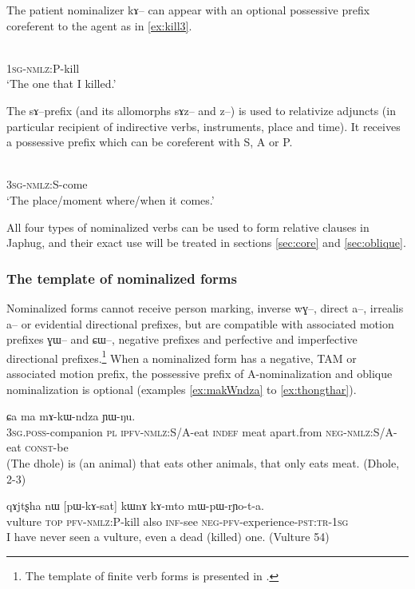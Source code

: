 \documentclass[oldfontcommands,oneside,a4paper,11pt]{article}
\newcommand{\ipa}[1]{{\phon #1}} %
\begin{document}
  The patient nominalizer \ipa{kɤ--} can appear with an optional possessive prefix coreferent to the agent as in \ref{ex:kill3}.
  \begin{exe}
\ex \label{ex:kill3}
\gll \ipa{a-kɤ-sat}    \\
   \textsc{1sg-nmlz}:P-kill \\
 \glt  `The one that I killed.'
 \end{exe}

The \ipa{sɤ}--prefix (and its allomorphs \ipa{sɤz}-- and \ipa{z}--) is used to relativize adjuncts (in particular recipient of indirective verbs, instruments, place and time).  It receives a possessive prefix  which can be coreferent with S, A or P.

   \begin{exe}
\ex \label{ex:come}
\gll \ipa{ɯ-sɤ-ɣi}    \\
   \textsc{3sg-nmlz}:S-come \\
 \glt  `The place/moment where/when it comes.'
 \end{exe}
 
 All four types of nominalized verbs can be used to form relative clauses in Japhug, and their exact use will be treated in sections \ref{sec:core} and \ref{sec:oblique}.
 
 \subsubsection{The template of nominalized forms}
Nominalized forms cannot receive person marking, inverse \ipa{wɣ}--, direct \ipa{a}--, irrealis \ipa{a}-- or evidential directional prefixes, but are compatible with associated motion prefixes \ipa{ɣɯ}-- and \ipa{ɕɯ}--, negative prefixes and perfective and imperfective directional prefixes.\footnote{The template of finite verb forms is presented in \citet{jacques13harmonization}.} When a nominalized form has a negative, TAM or associated motion prefix, the possessive prefix of A-nominalization and oblique nominalization is optional (examples \ref{ex:makWndza} to \ref{ex:thongthar}).
 


    \begin{exe}
\ex \label{ex:makWndza}
\gll
[\ipa{ɯ-zda}  	\ipa{ra}  	\ipa{chɯ-kɯ-ndza}]  	\ipa{ci,}  	\ipa{ɕa}  	\ipa{ma}  	\ipa{mɤ-kɯ-ndza}  	\ipa{ɲɯ-ŋu.}  	 \\
\textsc{3sg.poss}-companion  \textsc{pl} \textsc{ipfv-nmlz}:S/A-eat \textsc{indef} meat apart.from \textsc{neg-nmlz}:S/A-eat \textsc{const}-be \\
\glt (The dhole) is (an animal) that eats other animals, that only eats meat. (Dhole, 2-3)
 \end{exe}
     \begin{exe}
\ex \label{ex:kill4}
\gll
\ipa{qɤjtʂha}  	\ipa{nɯ}  	[\ipa{pɯ-kɤ-sat}]  	\ipa{kɯnɤ}  	\ipa{kɤ-mto}  	\ipa{mɯ-pɯ-rɲo-t-a.}  \\
vulture \textsc{top} \textsc{pfv-nmlz:P}-kill  also \textsc{inf}-see \textsc{neg-pfv}-experience-\textsc{pst:tr-1sg} \\
\glt I have never seen a vulture, even a dead (killed) one. (Vulture 54)
 \end{exe}
  
\end{document}
